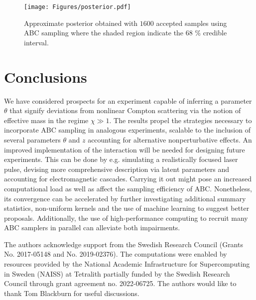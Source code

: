 \documentclass[%
 reprint,
 amsmath,amssymb,
 aps,
]{revtex4-2}
\begin{document}
\begin{figure}[ht]
\centering
\texttt{[image: Figures/posterior.pdf]}
\caption{\label{fig:Posterior} Approximate posterior obtained with $1600$ accepted samples using ABC sampling where the shaded region indicate the $68$ \% credible interval.}
\end{figure}

\section{Conclusions} \label{sec:Conclusion}
We have considered prospects for an experiment capable of inferring a parameter $\theta$ that signify deviations from nonlinear Compton scattering via the notion of effective mass in the regime $\chi \gg 1$. The results propel the strategies necessary to incorporate ABC sampling in analogous experiments, scalable to the inclusion of several parameters $\theta$ and $z$ accounting for alternative nonperturbative effects. An improved implementation of the interaction will be needed for designing future experiments. This can be done by e.g. simulating a realistically focused laser pulse, devising more comprehensive description via latent parameters and accounting for electromagnetic cascades. Carrying it out might pose an increased computational load as well as affect the sampling efficiency of ABC. Nonetheless, its convergence can be accelerated by further investigating additional summary statistics, non-uniform kernels and the use of machine learning to suggest better proposals. Additionally, the use of high-performance computing to recruit many ABC samplers in parallel can alleviate both impairments.

\begin{acknowledgments}
The authors acknowledge support from the Swedish Research Council (Grants No. 2017-05148 and No. 2019-02376). The computations were enabled by resources provided by the National Academic Infrastructure for Supercomputing in Sweden (NAISS) at Tetralith  partially funded by the Swedish Research Council through grant agreement no. 2022-06725. The authors would like to thank Tom Blackburn for useful discussions.
\end{acknowledgments}



\end{document}
